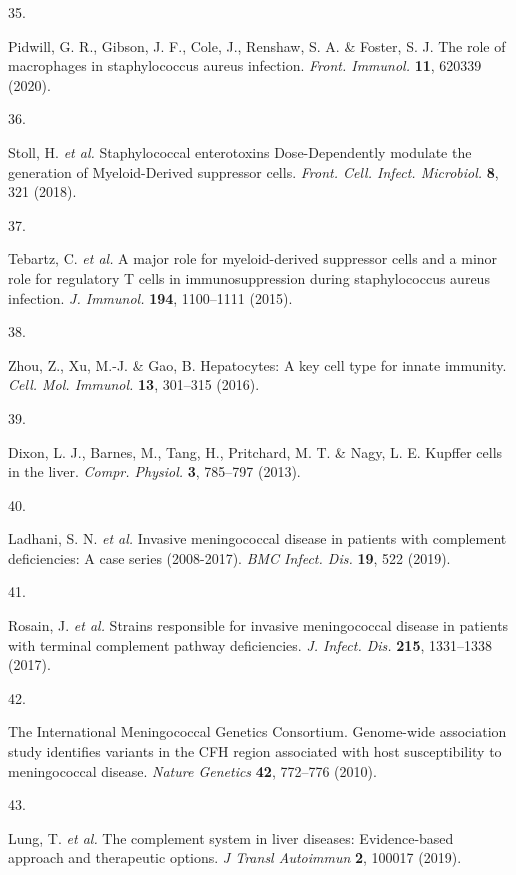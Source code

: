 \documentclass[
]{agujournal2019}
\newlength{\cslhangindent}
\newlength{\csllabelwidth}
\newenvironment{CSLReferences}[2] %
 {\begin{list}{}{%
  \setlength{\itemindent}{0pt}
  \setlength{\leftmargin}{0pt}
  \setlength{\parsep}{0pt}
  \ifodd #1
   \setlength{\leftmargin}{\cslhangindent}
   \setlength{\itemindent}{-1\cslhangindent}
  \fi
  \setlength{\itemsep}{#2\baselineskip}}}
 {\end{list}}
\newcommand{\CSLLeftMargin}[1]{\parbox[t]{\csllabelwidth}{\strut#1\strut}}
\newcommand{\CSLRightInline}[1]{\parbox[t]{\linewidth - \csllabelwidth}{\strut#1\strut}}
\begin{document}
\begin{CSLReferences}{0}{0}
\CSLLeftMargin{35. }%
\CSLRightInline{Pidwill, G. R., Gibson, J. F., Cole, J., Renshaw, S. A.
\& Foster, S. J. The role of macrophages in staphylococcus aureus
infection. \emph{Front. Immunol.} \textbf{11}, 620339 (2020).}

\CSLLeftMargin{36. }%
\CSLRightInline{Stoll, H. \emph{et al.} Staphylococcal enterotoxins
{Dose-Dependently} modulate the generation of {Myeloid-Derived}
suppressor cells. \emph{Front. Cell. Infect. Microbiol.} \textbf{8}, 321
(2018).}

\CSLLeftMargin{37. }%
\CSLRightInline{Tebartz, C. \emph{et al.} A major role for
myeloid-derived suppressor cells and a minor role for regulatory {T}
cells in immunosuppression during staphylococcus aureus infection.
\emph{J. Immunol.} \textbf{194}, 1100--1111 (2015).}

\CSLLeftMargin{38. }%
\CSLRightInline{Zhou, Z., Xu, M.-J. \& Gao, B. Hepatocytes: A key cell
type for innate immunity. \emph{Cell. Mol. Immunol.} \textbf{13},
301--315 (2016).}

\CSLLeftMargin{39. }%
\CSLRightInline{Dixon, L. J., Barnes, M., Tang, H., Pritchard, M. T. \&
Nagy, L. E. Kupffer cells in the liver. \emph{Compr. Physiol.}
\textbf{3}, 785--797 (2013).}

\CSLLeftMargin{40. }%
\CSLRightInline{Ladhani, S. N. \emph{et al.} Invasive meningococcal
disease in patients with complement deficiencies: A case series
(2008-2017). \emph{BMC Infect. Dis.} \textbf{19}, 522 (2019).}

\CSLLeftMargin{41. }%
\CSLRightInline{Rosain, J. \emph{et al.} Strains responsible for
invasive meningococcal disease in patients with terminal complement
pathway deficiencies. \emph{J. Infect. Dis.} \textbf{215}, 1331--1338
(2017).}

\CSLLeftMargin{42. }%
\CSLRightInline{The International Meningococcal Genetics Consortium.
Genome-wide association study identifies variants in the {CFH} region
associated with host susceptibility to meningococcal disease.
\emph{Nature Genetics} \textbf{42}, 772--776 (2010).}

\CSLLeftMargin{43. }%
\CSLRightInline{Lung, T. \emph{et al.} The complement system in liver
diseases: Evidence-based approach and therapeutic options. \emph{J
Transl Autoimmun} \textbf{2}, 100017 (2019).}


\end{CSLReferences}
\end{document}
